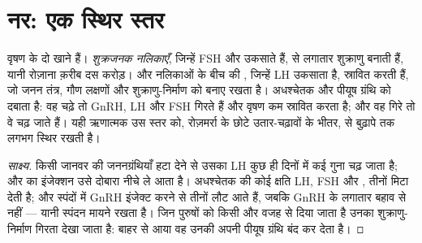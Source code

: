 \section{नर: एक स्थिर स्तर}

\begin{proposition}[वृषण का नियंत्रण]\label{prop:g11:hormones-and-reproduction:male}
वृषण के दो खाने हैं। \emph{शुक्रजनक नलिकाएँ}, जिन्हें FSH और
 उकसाते हैं,  से लगातार शुक्राणु बनाती हैं, यानी
रोज़ाना क़रीब दस करोड़। और नलिकाओं के बीच की , जिन्हें LH उकसाता है,
\emph{} स्रावित करती हैं, जो जनन तंत्र, गौण लक्षणों और
शुक्राणु-निर्माण को बनाए रखता है।  अधश्चेतक और पीयूष ग्रंथि को
दबाता है: वह चढ़े तो GnRH, LH और FSH गिरते हैं और वृषण कम स्रावित करता है;
और वह गिरे तो वे चढ़ जाते हैं। यही ऋणात्मक  उस स्तर को,
रोज़मर्रा के छोटे उतार-चढ़ावों के भीतर,  से बुढ़ापे तक लगभग स्थिर
रखती है।
\end{proposition}
\begin{proof}[साक्ष्य]
किसी जानवर की जननग्रंथियाँ हटा देने से उसका LH कुछ ही दिनों में कई गुना चढ़
जाता है; और  का इंजेक्शन उसे दोबारा नीचे ले आता है। अधश्चेतक
की कोई क्षति LH, FSH और , तीनों मिटा देती है; और स्पंदों में
GnRH इंजेक्ट करने से तीनों लौट आते हैं, जबकि GnRH के लगातार बहाव से नहीं
--- यानी स्पंदन मायने रखता है। जिन पुरुषों को किसी और वजह से
 दिया जाता है उनका शुक्राणु-निर्माण गिरता देखा जाता है: बाहर
से आया वह  उनकी अपनी पीयूष ग्रंथि बंद कर देता है।
\end{proof}

